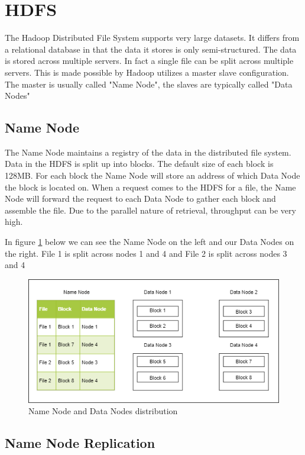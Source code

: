 \section{HDFS}

The Hadoop Distributed File System supports very large datasets. It differs from a relational database in that the data it stores is only semi-structured. The data is stored across multiple servers. In fact a single file can be split across multiple servers. This is made possible by Hadoop utilizes a master slave configuration. The master is usually called "Name Node", the slaves are typically called "Data Nodes"

\subsection{Name Node}

The Name Node maintains a registry of the data in the distributed file system. Data in the HDFS is split up into blocks. The default size of each block is 128MB. For each block the Name Node will store an address of which Data Node the block is located on. When a request comes to the HDFS for a file, the Name Node will forward the request to each Data Node to gather each block and assemble the file. Due to the parallel nature of retrieval, throughput can be very high.

In figure \ref{fig:name-node} below we can see the Name Node on the left and our Data Nodes on the right. File 1 is split across nodes 1 and 4 and File 2 is split across nodes 3 and 4

\begin{figure}[H]
  \includegraphics[width=\linewidth]{./images/name-node-data-node.png}
  \caption{Name Node and Data Nodes distribution}
  \label{fig:name-node}
\end{figure}

\subsection{Name Node Replication}

